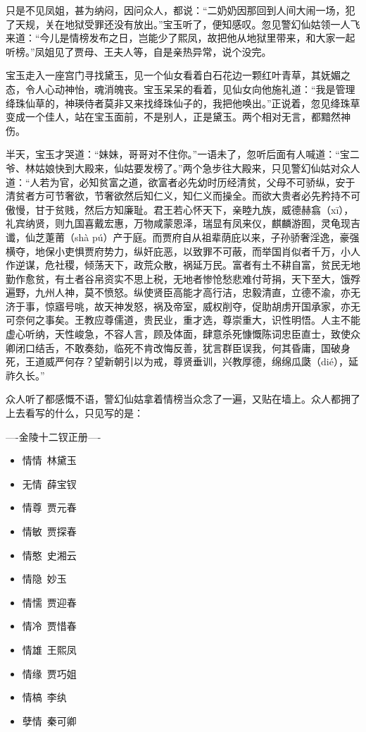 \documentclass[12pt,oneside]{book}
\begin{document}
只是不见凤姐，甚为纳闷，因问众人，都说：“二奶奶因那回到人间大闹一场，犯了天规，关在地狱受罪还没有放出。”宝玉听了，便知感叹。忽见警幻仙姑领一人飞来道：“今儿是情榜发布之日，岂能少了熙凤，故把他从地狱里带来，和大家一起听榜。”凤姐见了贾母、王夫人等，自是亲热异常，说个没完。

宝玉走入一座宫门寻找黛玉，见一个仙女看着白石花边一颗红叶青草，其妩媚之态，令人心动神怡，魂消魄丧。宝玉呆呆的看着，见仙女向他施礼道：“我是管理绛珠仙草的，神瑛侍者莫非又来找绛珠仙子的，我把他唤出。”正说着，忽见绛珠草变成一个佳人，站在宝玉面前，不是别人，正是黛玉。两个相对无言，都黯然神伤。

半天，宝玉才哭道：“妹妹，哥哥对不住你。”一语未了，忽听后面有人喊道：“宝二爷、林姑娘快到大殿来，仙姑要发榜了。”两个急步往大殿来，只见警幻仙姑对众人道：“人若为官，必知贫富之道，欲富者必先幼时历经清贫，父母不可骄纵，安于清贫者方可节奢欲，节奢欲然后知仁义，知仁义而操全。而欲大贵者必先矜持不可傲慢，甘于贫贱，然后方知廉耻。君王若心怀天下，亲睦九族，威德赫翕（xī），礼宾纳贤，则九国喜戴宏惠，万物咸蒙恩泽，瑞显有凤来仪，麒麟游囿，灵龟现吉谶，仙芝萐莆（shà pú）产于庭。而贾府自从祖辈荫庇以来，子孙骄奢淫逸，豪强横夺，地保小吏惧贾府势力，纵奸庇恶，以致罪不可蔽，而举国肖似者千万，小人作逆谋，危社稷，倾荡天下，政荒众散，祸延万民。富者有土不耕自富，贫民无地勤作愈贫，有土者谷帛资实不思上税，无地者惨怆愁悲难付苛捐，天下至大，饿殍遍野，九州人神，莫不愤怒。纵使贤臣高能才高行洁，忠毅清直，立德不渝，亦无济于事，惊寤号咷，故天神发怒，祸及帝室，威权削夺，促助胡虏开国承家，亦无可奈何之事矣。王教应尊儒道，贵民业，重才选，尊崇重大，识性明悟。人主不能虚心听纳，天性峻急，不容人言，顾及体面，肆意杀死慷慨陈词忠臣直士，致使众卿闭口结舌，不敢奏劾，临死不肯改悔反善，犹言群臣误我，何其昏庸，国破身死，王道威严何存？望新朝引以为戒，尊贤垂训，兴教厚德，绵绵瓜瓞（dié），延祚久长。”

众人听了都感慨不语，警幻仙姑拿着情榜当众念了一遍，又贴在墙上。众人都拥了上去看写的什么，只见写的是：

----金陵十二钗正册----

\begin{itemize}
\item 情情~林黛玉
\item 无情~薛宝钗
\item 情尊~贾元春
\item 情敏~贾探春
\item 情憨~史湘云
\item 情隐~妙玉 
\item 情懦~贾迎春
\item 情冷~贾惜春
\item 情雄~王熙凤
\item 情缘~贾巧姐
\item 情槁~李纨
\item 孽情~秦可卿
\end{itemize}
\end{document}

